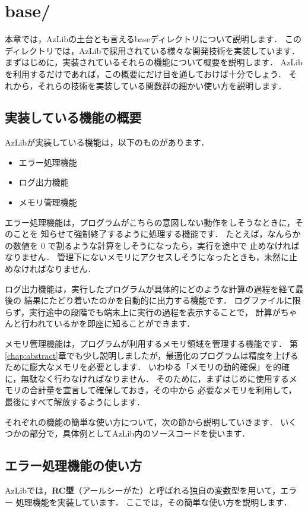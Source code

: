 \chapter{base/} \label{chap:base}

本章では，AzLibの土台とも言えるbaseディレクトリについて説明します．
このディレクトリでは，AzLibで採用されている様々な開発技術を実装しています．
まずはじめに，実装されているそれらの機能について概要を説明します．
AzLibを利用するだけであれば，この概要にだけ目を通しておけば十分でしょう．
それから，それらの技術を実装している関数群の細かい使い方を説明します．


\section{実装している機能の概要}
AzLibが実装している機能は，以下のものがあります．
\begin{itemize}
	\item エラー処理機能
	\item ログ出力機能
	\item メモリ管理機能
\end{itemize}

エラー処理機能は，プログラムがこちらの意図しない動作をしそうなときに，そのことを
知らせて強制終了するように処理する機能です．
たとえば，なんらかの数値を $0$ で割るような計算をしそうになったら，実行を途中で
止めなければなりません．
管理下にないメモリにアクセスしそうになったときも，未然に止めなければなりません．

ログ出力機能は，実行したプログラムが具体的にどのような計算の過程を経て最後の
結果にたどり着いたのかを自動的に出力する機能です．
ログファイルに限らず，実行途中の段階でも端末上に実行の過程を表示することで，
計算がちゃんと行われているかを即座に知ることができます．

メモリ管理機能は，プログラムが利用するメモリ領域を管理する機能です．
第\ref{chap:abstract}章でも少し説明しましたが，最適化のプログラムは精度を上げる
ために膨大なメモリを必要とします．
いわゆる「メモリの動的確保」を的確に，無駄なく行わなければなりません．
そのために，まずはじめに使用するメモリの合計量を宣言して確保しておき，その中から
必要なメモリを利用して，最後にすべて解放するようにします．

それぞれの機能の簡単な使い方について，次の節から説明していきます．
いくつかの部分で，具体例としてAzLib内のソースコードを使います．


\section{エラー処理機能の使い方}
AzLibでは，\textbf{RC型}（アールシーがた）と呼ばれる独自の変数型を用いて，エラー
処理機能を実装しています．
ここでは，その簡単な使い方を説明します．

